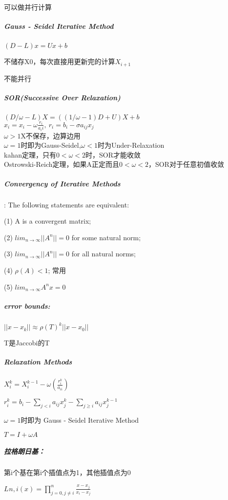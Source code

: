 \documentclass[]{article}
\let\oldsubparagraph\subparagraph
\renewcommand{\subparagraph}[1]{\oldsubparagraph{#1}\mbox{}}
\begin{document}
\begin{multicols}{3}
可以做并行计算

\subparagraph{Gauss - Seidel Iterative Method}\label{header-c210}

\((D-L)x = Ux+b\)

不储存X0，每次直接用更新完的计算\(X_{i+1}\)

不能并行

\subparagraph{SOR(Successive Over Relaxation)}\label{header-c216}

\((D/\omega-L)X = ((1/\omega-1)D +U)X+b\)\\
\(x_i=x_i-\omega\frac{r_i}{a_ii},\ r_i=b_i-\sigma a_{ij}x_j \)\\
\(\omega>1\)X不保存，边算边用\\
\(\omega=1\)时即为Gauss-Seidel,\(\omega<1\)时为Under-Relaxation\\
kahan定理，只有\(0<\omega<2\)时，SOR才能收敛\\
Ostrowski-Reich定理，如果A正定而且\(0<\omega<2\)，SOR对于任意初值收敛\\
\subparagraph{Convergency of Iterative Methods}\label{header-c220}

: The following statements are equivalent:

(1) A is a convergent matrix;

(2) \( lim_{n\to\infty} ||A^n|| = 0\) for some natural norm;

(3) \( lim_{n\to\infty}||A^n|| = 0\) for all natural norms;

(4) \( \rho(A) < 1\); 常用

(5) \( lim_{n\to\infty} A^nx = 0\)

\subparagraph{error bounds:}\label{header-c235}

\(||x - x_k|| \approx \rho (T)^k ||x - x_0||\)

T是Jaccobi的T

\subparagraph{Relaxation Methods}\label{header-c242}

\(X_ i^k = X_i^{k-1} - \omega(\frac{r_i^k}{a_{ii}})\)

\(r_i^k = b_i - \sum_{j<i}{a_{ij}x_j^k} - \sum_{j\ge i}{a_{ij}x_j^{k-1}} \)

\(\omega = 1\)时即为 Gauss - Seidel Iterative Method

\(T = I + \omega A\)


\subparagraph{拉格朗日基：}\label{header-c254}

第i个基在第i个插值点为1，其他插值点为0

\(L_{}n,i(x)= \prod_{j = 0, j \neq i}^n \frac{x - x_j}{x_i -x_j} \)\\


\end{multicols}
\end{document}
